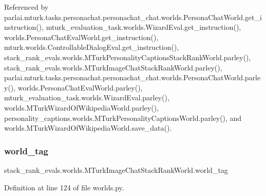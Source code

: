 Referenced by parlai.\+mturk.\+tasks.\+personachat.\+personachat\+\_\+chat.\+worlds.\+Persona\+Chat\+World.\+get\+\_\+instruction(), mturk\+\_\+evaluation\+\_\+task.\+worlds.\+Wizard\+Eval.\+get\+\_\+instruction(), worlds.\+Persona\+Chat\+Eval\+World.\+get\+\_\+instruction(), mturk.\+worlds.\+Controllable\+Dialog\+Eval.\+get\+\_\+instruction(), stack\+\_\+rank\+\_\+evals.\+worlds.\+M\+Turk\+Personality\+Captions\+Stack\+Rank\+World.\+parley(), stack\+\_\+rank\+\_\+evals.\+worlds.\+M\+Turk\+Image\+Chat\+Stack\+Rank\+World.\+parley(), parlai.\+mturk.\+tasks.\+personachat.\+personachat\+\_\+chat.\+worlds.\+Persona\+Chat\+World.\+parley(), worlds.\+Persona\+Chat\+Eval\+World.\+parley(), mturk\+\_\+evaluation\+\_\+task.\+worlds.\+Wizard\+Eval.\+parley(), worlds.\+M\+Turk\+Wizard\+Of\+Wikipedia\+World.\+parley(), personality\+\_\+captions.\+worlds.\+M\+Turk\+Personality\+Captions\+World.\+parley(), and worlds.\+M\+Turk\+Wizard\+Of\+Wikipedia\+World.\+save\+\_\+data().

\mbox{\label{classstack__rank__evals_1_1worlds_1_1MTurkImageChatStackRankWorld_a7b42699f381f01295b605767127fbc78}} 
\subsubsection{\texorpdfstring{world\+\_\+tag}{world\_tag}}
{\footnotesize\ttfamily stack\+\_\+rank\+\_\+evals.\+worlds.\+M\+Turk\+Image\+Chat\+Stack\+Rank\+World.\+world\+\_\+tag}



Definition at line 124 of file worlds.\+py.



